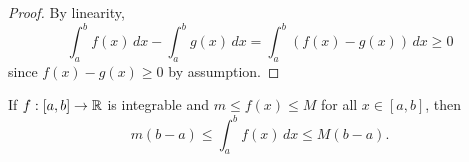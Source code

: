 \begin{proof}
  By linearity,
  \[
    \int_a^b f(x)\, dx - \int_a^b g(x)\, dx =
    \int_a^b (f(x) - g(x))\, dx \ge 0
  \]
  since $f(x) - g(x) \ge 0$ by assumption.
\end{proof}

\begin{corollary}
  If $f : [a, b] \to \mathbb{R}$ is integrable and
  $m \le f(x) \le M$ for all $x \in [a, b]$, then
  \[
    m(b - a) \le \int_a^b f(x)\, dx \le M(b - a).
  \]
\end{corollary}
